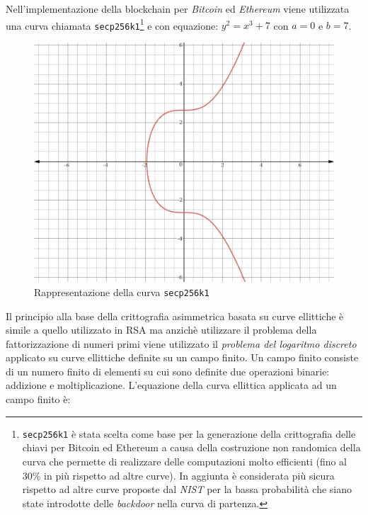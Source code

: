 Nell'implementazione della blockchain per \textit{Bitcoin} ed \textit{Ethereum} viene utilizzata una curva chiamata \texttt{secp256k1}\footnote{\texttt{secp256k1} è stata scelta come base per la generazione della crittografia delle chiavi per Bitcoin ed Ethereum a causa della costruzione non randomica della curva che permette di realizzare delle computazioni molto efficienti (fino al 30\% in più rispetto ad altre curve). In aggiunta è considerata più sicura rispetto ad altre curve proposte dal \textit{NIST} per la bassa probabilità che siano state introdotte delle \textit{backdoor} nella curva di partenza.} e con equazione: $y^2=x^3+7$ con $a=0$ e $b=7$.\newline
\begin{figure}
    \centering
    \includegraphics[scale=0.9]{images/secp256k1.png}
    \caption{Rappresentazione della curva \texttt{secp256k1}}
\end{figure}
Il principio alla base della crittografia asimmetrica basata su curve ellittiche è simile a quello utilizzato in RSA ma anzichè utilizzare il problema della fattorizzazione di numeri primi viene utilizzato il \textit{problema del logaritmo discreto} applicato su curve ellittiche definite su un campo finito.\newline
Un campo finito consiste di un numero finito di elementi su cui sono definite due operazioni binarie: addizione e moltiplicazione. L'equazione della curva ellittica applicata ad un campo finito è:

